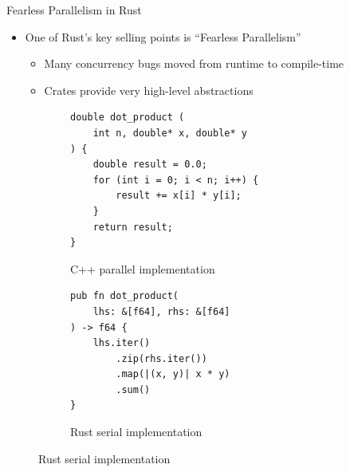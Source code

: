 \documentclass[10pt,aspectratio=169]{beamer}
\begin{document}
\begin{frame}[fragile]{Fearless Parallelism in Rust}
    \begin{itemize}
        \item One of Rust's key selling points is ``Fearless Parallelism''
        \begin{itemize}
            \item Many concurrency bugs moved from runtime to compile-time
            \item Crates provide very high-level abstractions
        \end{itemize}
    \end{itemize}    
    \vspace*{0.15cm}

    \begin{figure}
        \begin{subfigure}[c]{.55\textwidth}\centering
            \begin{verbatim}
double dot_product (
    int n, double* x, double* y
) {
    double result = 0.0;
    for (int i = 0; i < n; i++) {
        result += x[i] * y[i];
    }
    return result;
}
            \end{verbatim}
            \label{fig:cpp-ddot-serial}
            \caption{C++ parallel implementation}
        \end{subfigure}%
        \begin{subfigure}[c]{.45\textwidth}\centering
            \begin{verbatim}
pub fn dot_product(
    lhs: &[f64], rhs: &[f64]
) -> f64 {
    lhs.iter()
        .zip(rhs.iter())
        .map(|(x, y)| x * y)
        .sum()
}
            \end{verbatim}
            \label{fig:rust-ddot-serial}
            \vspace*{0.5cm}
            \caption{Rust serial implementation}
        \end{subfigure}
    \end{figure}
\end{frame}
\end{document}
